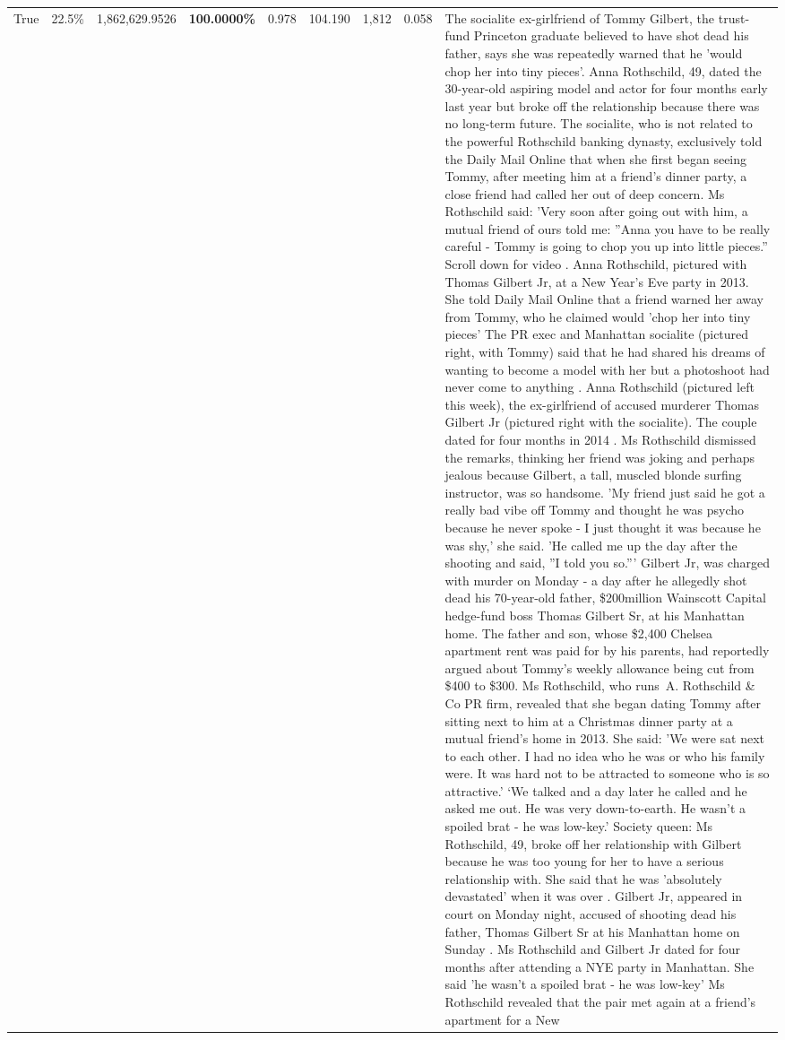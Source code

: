 \begin{table}[H]
\begin{tabular}{lllrlllll}
True & 22.5\% & 1,862,629.9526 & \bfseries \color{red} 100.0000\% & 0.978 & 104.190 & 1,812 & 0.058 & The socialite ex-girlfriend of Tommy Gilbert, the trust-fund Princeton graduate believed to have shot dead his father, says she was repeatedly warned that he 'would chop her into tiny pieces'. Anna Rothschild, 49, dated the 30-year-old aspiring model and actor for four months early last year but broke off the relationship because there was no long-term future. The socialite, who is not related to the powerful Rothschild banking dynasty, exclusively told the Daily Mail Online that when she first began seeing Tommy, after meeting him at a friend's dinner party, a close friend had called her out of deep concern. Ms Rothschild said: 'Very soon after going out with him, a mutual friend of ours told me: ''Anna you have to be really careful - Tommy is going to chop you up into little pieces.'' Scroll down for video . Anna Rothschild, pictured with Thomas Gilbert Jr, at a New Year's Eve party in 2013. She told Daily Mail Online that a friend warned her away from Tommy, who he claimed would 'chop her into tiny pieces' The PR exec and Manhattan socialite (pictured right, with Tommy) said that he had shared his dreams of wanting to become a model with her but a photoshoot had never come to anything . Anna Rothschild (pictured left this week), the ex-girlfriend of accused murderer Thomas Gilbert Jr (pictured right with the socialite). The couple dated for four months in 2014 . Ms Rothschild dismissed the remarks, thinking her friend was joking and perhaps jealous because Gilbert, a tall, muscled blonde surfing instructor, was so handsome. 'My friend just said he got a really bad vibe off Tommy and thought he was psycho because he never spoke - I just thought it was because he was shy,' she said. 'He called me up the day after the shooting and said, ''I told you so.''' Gilbert Jr, was charged with murder on Monday - a day after he allegedly shot dead his 70-year-old father, \$200million Wainscott Capital hedge-fund boss Thomas Gilbert Sr, at his Manhattan home. The father and son, whose \$2,400 Chelsea apartment rent was paid for by his parents, had reportedly argued about Tommy's weekly allowance being cut from \$400 to \$300. Ms Rothschild, who runs A. Rothschild \& Co PR firm, revealed that she began dating Tommy after sitting next to him at a Christmas dinner party at a mutual friend's home in 2013. She said: 'We were sat next to each other. I had no idea who he was or who his family were. It was hard not to be attracted to someone who is so attractive.' ‘We talked and a day later he called and he asked me out. He was very down-to-earth. He wasn’t a spoiled brat - he was low-key.’ Society queen: Ms Rothschild, 49, broke off her relationship with Gilbert because he was too young for her to have a serious relationship with. She said that he was 'absolutely devastated' when it was over . Gilbert Jr, appeared in court on Monday night, accused of shooting dead his father, Thomas Gilbert Sr at his Manhattan home on Sunday . Ms Rothschild and Gilbert Jr dated for four months after attending a NYE party in Manhattan. She said 'he wasn't a spoiled brat - he was low-key' Ms Rothschild revealed that the pair met again at a friend’s apartment for a New 
\end{tabular}
\end{table}
